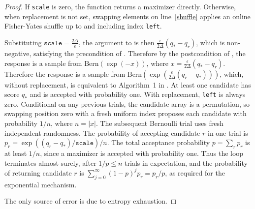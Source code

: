 \documentclass{article}
\begin{document}
\begin{proof}
    If \texttt{scale} is zero, the function returns a maximizer directly.
    Otherwise, when replacement is not set, swapping elements on line~\ref{shuffle}
    applies an online Fisher-Yates shuffle up to and including index \texttt{left}.

    Substituting $\texttt{scale} = \frac{2\Delta}{\epsilon}$,
    the argument to  is then $\frac{\epsilon}{2\Delta}(q_* - q_r)$,
    which is non-negative, satisfying the precondition of .
    Therefore by the postcondition of ,
    the response is a sample from $\mathrm{Bern}(\exp(-x))$, where $x = \frac{\epsilon}{2\Delta}(q_* - q_r)$.
    Therefore the response is a sample from $\mathrm{Bern}(\exp(\frac{\epsilon}{2\Delta}(q_r - q_*)))$,
    which, without replacement, is equivalent to Algorithm~1 in \cite{mckenna2020permute}.
    At least one candidate has score $q_*$ and is accepted with probability one.
    With replacement, \texttt{left} is always zero.
    Conditional on any previous trials, the candidate array is a permutation,
    so swapping position zero with a fresh uniform index proposes each candidate with probability $1/n$, where $n=|x|$.
    The subsequent Bernoulli trial uses fresh independent randomness.
    The probability of accepting candidate $r$ in one trial is
    $p_r=\exp((q_r-q_*)/\texttt{scale})/n$.
    The total acceptance probability $p=\sum_r p_r$ is at least $1/n$,
    since a maximizer is accepted with probability one.
    Thus the loop terminates almost surely, after $1/p\leq n$ trials in expectation,
    and the probability of returning candidate $r$ is
    $\sum_{j=0}^{\infty}(1-p)^j p_r=p_r/p$,
    as required for the exponential mechanism.

    The only source of error is due to entropy exhaustion.
\end{proof}



\end{document}
